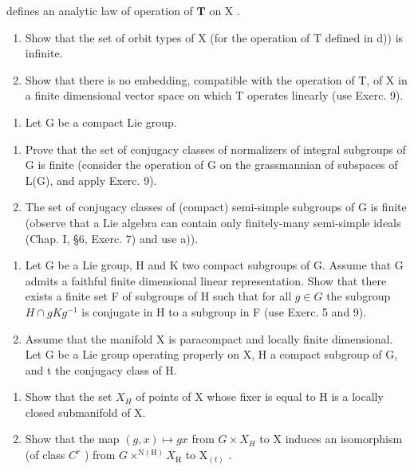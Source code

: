 defines an analytic law of operation of \(\mathbf{T}\) on \(\mathrm{X}\) .

\begin{enumerate}
\def\labelenumi{\alph{enumi})}
\setcounter{enumi}{4}
\item
  Show that the set of orbit types of X (for the operation of T defined in d)) is infinite.
\item
  Show that there is no embedding, compatible with the operation of T, of X in a finite dimensional vector space on which T operates linearly (use Exerc. 9).
\end{enumerate}

\begin{enumerate}
\def\labelenumi{\arabic{enumi})}
\setcounter{enumi}{11}
\tightlist
\item
  Let \(\mathrm{G}\) be a compact Lie group.
\end{enumerate}

\begin{enumerate}
\def\labelenumi{\alph{enumi})}
\item
  Prove that the set of conjugacy classes of normalizers of integral subgroups of G is finite (consider the operation of G on the grassmannian of subspaces of L(G), and apply Exerc. 9).
\item
  The set of conjugacy classes of (compact) semi-simple subgroups of G is finite (observe that a Lie algebra can contain only finitely-many semi-simple ideals (Chap. I, §6, Exerc. 7) and use a)).
\end{enumerate}

\begin{enumerate}
\def\labelenumi{\arabic{enumi})}
\setcounter{enumi}{12}
\item
  Let G be a Lie group, H and K two compact subgroups of G. Assume that G admits a faithful finite dimensional linear representation. Show that there exists a finite set F of subgroups of H such that for all \(g \in G\) the subgroup \(H \cap gKg^{-1}\) is conjugate in H to a subgroup in F (use Exerc. 5 and 9).
\item
  Assume that the manifold X is paracompact and locally finite dimensional. Let G be a Lie group operating properly on X, H a compact subgroup of G, and t the conjugacy class of H.
\end{enumerate}

\begin{enumerate}
\def\labelenumi{\alph{enumi})}
\item
  Show that the set \(X_{H}\) of points of X whose fixer is equal to H is a locally closed submanifold of X.
\item
  Show that the map \((g,x)\mapsto gx\) from \(G\times X_{H}\) to X induces an isomorphism (of class \(C^{r}\) ) from \(G\times^{\mathrm{N(H)}}X_{\mathrm{H}}\) to \(\mathrm{X}_{(t)}\) .
\end{enumerate}

